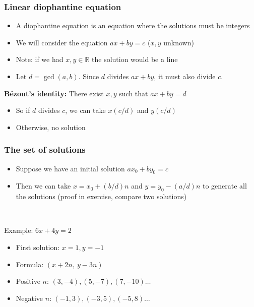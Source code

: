 \documentclass[12pt]{beamer}
\begin{document}
\begin{frame}
\frametitle{Linear diophantine equation}
\begin{itemize}
\item A diophantine equation is an equation where the solutions must be integers
\item We will consider the equation $ax+by=c$ ($x,y$ unknown)
\item Note: if we had $x,y \in \mathbb{R}$ the solution would be a line
\item Let $d = \gcd(a,b)$. Since $d$ divides $ax+by$, it must also divide $c$.
\end{itemize}

\textbf{Bézout's identity:} There exist $x,y$ such that $ax+by=d$

\begin{itemize}
\item So if $d$ divides $c$, we can take $x(c/d)$ and $y(c/d)$
\item Otherwise, no solution
\end{itemize}
\end{frame}

\begin{frame}
\frametitle{The set of solutions}
\begin{itemize}
\item Suppose we have an initial solution $ax_0+by_0=c$
\item Then we can take $x=x_0+(b/d)n$ and $y=y_0-(a/d)n$ to generate all the solutions (proof in exercise, compare two solutions)
\end{itemize}

~

Example: $6x+4y = 2$
\begin{itemize}
\item First solution: $x=1, y=-1$
\item Formula: $(x+2n,\ y-3n)$
\item Positive $n$: $(3,-4), (5,-7), (7,-10) \ldots$
\item Negative $n$: $(-1, 3), (-3, 5), (-5, 8) \ldots$
\end{itemize}
\end{frame}

\newcommand{\blue}{\textcolor{blue}}
\newcommand{\red}{\textcolor{red}}
\end{document}

